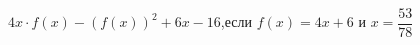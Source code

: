 \begin{ex}[type=calculate_expression]
	\begin{condition}
		\( 4x\cdot f(x)-(f(x))^2 +6x -16 \),\quad если \( f(x)=4x+6 \) и \( x=\dfrac{53}{78} \)
	\end{condition}
\end{ex}